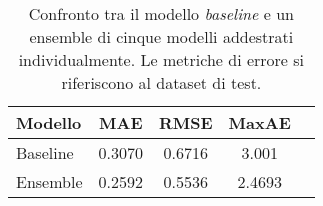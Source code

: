 \begin{table}[btp]
  \centering
  \begin{tabular}{lcccc}
    \toprule
    Modello         &  MAE   &  RMSE  & MaxAE \\
    \midrule
    Baseline        & 0.3070 & 0.6716 & 3.001 \\
    Ensemble        & 0.2592 & 0.5536 & 2.4693 \\
    \bottomrule
  \end{tabular}
  \caption{Confronto tra il modello \emph{baseline} e un ensemble di cinque
    modelli addestrati individualmente. Le metriche di errore si riferiscono
    al dataset di test.}%
  \label{tab:ensemble}%
\end{table}

